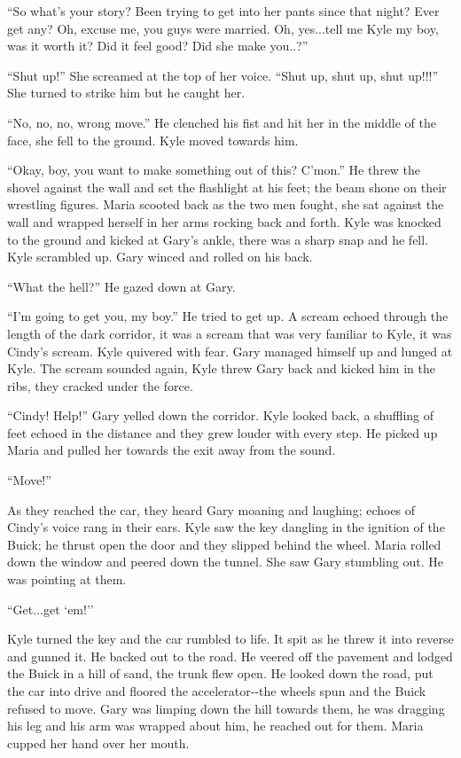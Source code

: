 ``So what's your story? Been trying to get into her pants since that
night? Ever get any? Oh, excuse me, you guys were married. Oh,
yes...tell me Kyle my boy, was it worth it? Did it feel good? Did she
make you..?''

``Shut up!'' She screamed at the top of her voice. ``Shut up, shut up,
shut up!!!'' She turned to strike him but he caught her.

``No, no, no, wrong move.'' He clenched his fist and hit her in the
middle of the face, she fell to the ground. Kyle moved towards him.

``Okay, boy, you want to make something out of this? C'mon.'' He threw
the shovel against the wall and set the flashlight at his feet; the beam
shone on their wrestling figures. Maria scooted back as the two men
fought, she sat against the wall and wrapped herself in her arms rocking
back and forth. Kyle was knocked to the ground and kicked at Gary's
ankle, there was a sharp snap and he fell. Kyle scrambled up. Gary
winced and rolled on his back.

``What the hell?'' He gazed down at Gary.

``I'm going to get you, my boy.'' He tried to get up. A scream echoed
through the length of the dark corridor, it was a scream that was very
familiar to Kyle, it was Cindy's scream. Kyle quivered with fear. Gary
managed himself up and lunged at Kyle. The scream sounded again, Kyle
threw Gary back and kicked him in the ribs, they cracked under the
force.

``Cindy! Help!'' Gary yelled down the corridor. Kyle looked back, a
shuffling of feet echoed in the distance and they grew louder with every
step. He picked up Maria and pulled her towards the exit away from the
sound.

``Move!''

As they reached the car, they heard Gary moaning and laughing; echoes of
Cindy's voice rang in their ears. Kyle saw the key dangling in the
ignition of the Buick; he thrust open the door and they slipped behind
the wheel. Maria rolled down the window and peered down the tunnel. She
saw Gary stumbling out. He was pointing at them.

``Get...get `em!''

Kyle turned the key and the car rumbled to life. It spit as he threw it
into reverse and gunned it. He backed out to the road. He veered off the
pavement and lodged the Buick in a hill of sand, the trunk flew open. He
looked down the road, put the car into drive and floored the
accelerator-\/-the wheels spun and the Buick refused to move. Gary was
limping down the hill towards them, he was dragging his leg and his arm
was wrapped about him, he reached out for them. Maria cupped her hand
over her mouth.

